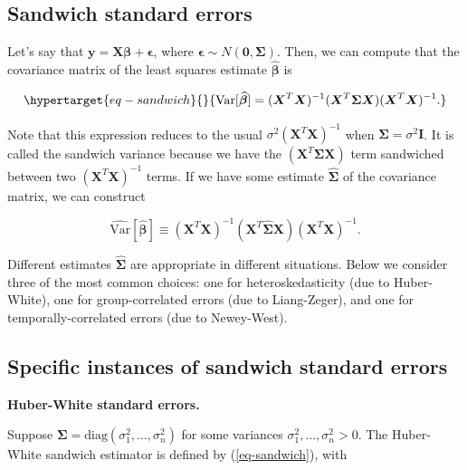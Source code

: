 \documentclass[
  11pt,
  letterpaper,
  oneside]{book}
\theoremstyle{definition}
\theoremstyle{plain}
\theoremstyle{plain}
\theoremstyle{plain}
\theoremstyle{remark}
\begin{document}
\hypertarget{sec-sandwich-errors}{%
\subsection{Sandwich standard errors}\label{sec-sandwich-errors}}

Let's say that
\(\boldsymbol{y} = \boldsymbol{X} \boldsymbol{\beta} + \boldsymbol{\epsilon}\),
where
\(\boldsymbol{\epsilon} \sim N(\boldsymbol{0}, \boldsymbol{\Sigma})\).
Then, we can compute that the covariance matrix of the least squares
estimate \(\boldsymbol{\widehat{\beta}}\) is

\begin{equation}\protect\hypertarget{eq-sandwich}{}{
\text{Var}[\boldsymbol{\widehat{\beta}}] = (\boldsymbol{X}^T \boldsymbol{X})^{-1}(\boldsymbol{X}^T \boldsymbol{\Sigma} \boldsymbol{X})(\boldsymbol{X}^T \boldsymbol{X})^{-1}.
}\label{eq-sandwich}\end{equation}

Note that this expression reduces to the usual
\(\sigma^2(\boldsymbol{X}^T \boldsymbol{X})^{-1}\) when
\(\boldsymbol{\Sigma} = \sigma^2 \boldsymbol{I}\). It is called the
sandwich variance because we have the
\((\boldsymbol{X}^T \boldsymbol{\Sigma} \boldsymbol{X})\) term
sandwiched between two \((\boldsymbol{X}^T \boldsymbol{X})^{-1}\) terms.
If we have some estimate \(\boldsymbol{\widehat{\Sigma}}\) of the
covariance matrix, we can construct

\[
\widehat{\text{Var}}[\boldsymbol{\widehat{\beta}}] \equiv (\boldsymbol{X}^T \boldsymbol{X})^{-1}(\boldsymbol{X}^T \boldsymbol{\widehat{\Sigma}} \boldsymbol{X})(\boldsymbol{X}^T \boldsymbol{X})^{-1}.
\]

Different estimates \(\boldsymbol{\widehat{\Sigma}}\) are appropriate in
different situations. Below we consider three of the most common
choices: one for heteroskedasticity (due to Huber-White), one for
group-correlated errors (due to Liang-Zeger), and one for
temporally-correlated errors (due to Newey-West).

\hypertarget{sec-specific-sandwich-errors}{%
\subsection{Specific instances of sandwich standard
errors}\label{sec-specific-sandwich-errors}}

\textbf{Huber-White standard errors.}

Suppose
\(\boldsymbol{\Sigma} = \text{diag}(\sigma_1^2, \dots, \sigma_n^2)\) for
some variances \(\sigma_1^2, \dots, \sigma_n^2 > 0\). The Huber-White
sandwich estimator is defined by (\ref{eq-sandwich}), with
\end{document}
